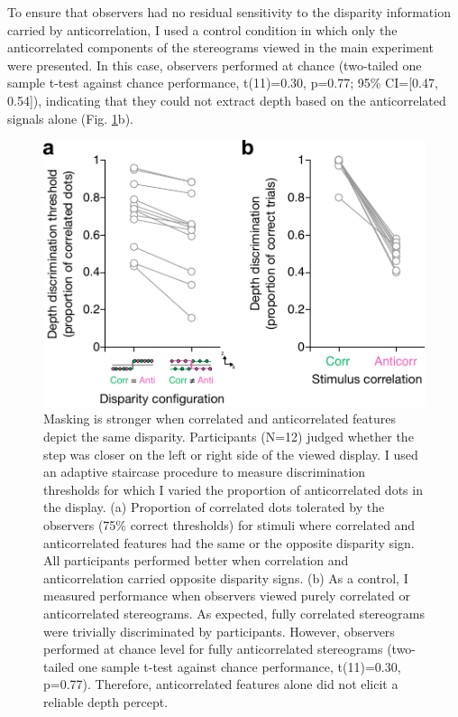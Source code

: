 To ensure that observers had no residual sensitivity to the disparity information carried by anticorrelation, I used a control condition in which only the anticorrelated components of the stereograms viewed in the main experiment were presented. In this case, observers performed at chance (two-tailed one sample t-test against chance performance, t(11)=0.30, p=0.77; 95\% CI=[0.47, 0.54]), indicating that they could not extract depth based on the anticorrelated signals alone (Fig. \ref{fig:c2f2}b).

\begin{figure}
  \centering
  \includegraphics{Fig2}
  \caption[Masking is stronger when correlated and anticorrelated features depict the same disparity.]{Masking is stronger when correlated and anticorrelated features depict the same disparity. Participants (N=12) judged whether the step was closer on the left or right side of the viewed display. I used an adaptive staircase procedure to measure discrimination thresholds for which I varied the proportion of anticorrelated dots in the display. (a) Proportion of correlated dots tolerated by the observers (75\% correct thresholds) for stimuli where correlated and anticorrelated features had the same or the opposite disparity sign. All participants performed better when correlation and anticorrelation carried opposite disparity signs. (b) As a control, I measured performance when observers viewed purely correlated or anticorrelated stereograms. As expected, fully correlated stereograms were trivially discriminated by participants. However, observers performed at chance level for fully anticorrelated stereograms (two-tailed one sample t-test against chance performance, t(11)=0.30, p=0.77). Therefore, anticorrelated features alone did not elicit a reliable depth percept.}
  \label{fig:c2f2}
\end{figure}

